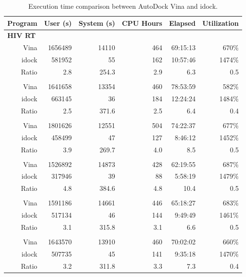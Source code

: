 \begin{table}[h!]
\centering
\begin{tabular*}
{\textwidth}
{@{\extracolsep{\fill}}rrrrrr}
\toprule
Program & User (s) & System (s) & CPU Hours & Elapsed & Utilization\\
\midrule
\multicolumn{6}{l}{\textbf{HIV RT}}\\
Vina	& 1656489  &	14110 &	464  & 69:15:13 &   670\%\\
idock	&   581952  &	     55 & 162  & 10:57:46 & 1474\%\\
Ratio &        2.8   & 254.3 &  2.9  &         6.3 &    0.5\\
\noalign{\smallskip\smallskip}
\multicolumn{6}{l}{\textbf{SAHH}}\\
Vina	& 1641658  &	13354 & 460 & 78:53:59 &   582\%\\
idock	&   663145  &      36 & 184 & 12:24:24 & 1484\%\\
Ratio &         2.5  &	 371.6 &  2.5 &         6.4 &   0.4\\
\noalign{\smallskip\smallskip}
\multicolumn{6}{l}{\textbf{ADA}}\\
Vina	& 1801626  &	12551 &	504 & 74:22:37 &   677\%\\
idock	&   458499  &      47 &	127 &   8:46:12 & 1452\%\\
Ratio &         3.9  &  269.7 & 4.0 &         8.5 &    0.5\\
\noalign{\smallskip\smallskip}
\multicolumn{6}{l}{\textbf{PNP}}\\
Vina	& 1526892  &	14873 & 428 & 62:19:55 &  687\%\\
idock	&   317946  &      39 &   88 &  5:58:19 & 1479\%\\
Ratio &         4.8  &  384.6 &  4.8 &       10.4 &   0.5\\
\noalign{\smallskip\smallskip}
\multicolumn{6}{l}{\textbf{AdoMetDC}}\\
Vina	& 1591186  &	14661 &	446 & 65:18:27 &   683\%\\
idock	&   517134  &	     46 &	144 &   9:49:49 & 1461\%\\
Ratio &         3.1  & 315.8 &  3.1 &         6.6 &    0.5\\
\noalign{\smallskip\smallskip}
\multicolumn{6}{l}{\textbf{Average}}\\
Vina	& 1643570  &	13910 &	460 & 70:02:02 &   660\%\\
idock	&   507735  &	     45 &	141 &   9:35:18 & 1470\%\\
Ratio &         3.2  & 311.8 &  3.3 &         7.3 &    0.4\\
\bottomrule
\end{tabular*}
\caption{Execution time comparison between AutoDock Vina and idock.}
\label{tab:DockingExecutionTimeComparison}
\end{table}

